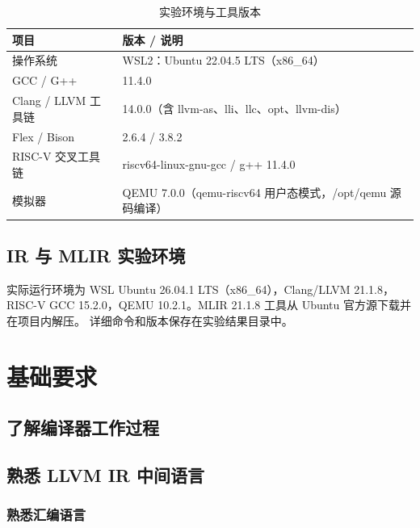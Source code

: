 \documentclass[UTF8,a4paper,10pt]{ctexart}
\begin{document}
\begin{table}[!htbp]
  \centering
  \caption{实验环境与工具版本}
  \label{tab:env}
  \begin{tabular}{ll}
  \toprule
  项目 & 版本 / 说明\\
  \midrule
  操作系统 & WSL2：Ubuntu 22.04.5 LTS（x86\_64）\\
  GCC / G++ & 11.4.0\\
  Clang / LLVM 工具链 & 14.0.0（含 llvm-as、lli、llc、opt、llvm-dis）\\
  Flex / Bison & 2.6.4 / 3.8.2\\
  RISC-V 交叉工具链 & riscv64-linux-gnu-gcc / g++ 11.4.0\\
  模拟器 & QEMU 7.0.0（qemu-riscv64 用户态模式，/opt/qemu 源码编译）\\
  \bottomrule
  \end{tabular}
\end{table}
\subsection{IR 与 MLIR 实验环境}
实际运行环境为 WSL Ubuntu 26.04.1 LTS（x86\_64），Clang/LLVM 21.1.8，
RISC-V GCC 15.2.0，QEMU 10.2.1。MLIR 21.1.8 工具从 Ubuntu 官方源下载并在项目内解压。
详细命令和版本保存在实验结果目录中。

\section{基础要求}
\subsection{了解编译器工作过程}
\begingroup

\endgroup

\subsection{熟悉 LLVM IR 中间语言}
\begingroup
\let\subsection\subsubsection

\endgroup

\subsection{熟悉汇编语言}
\begingroup
\let\subsection\subsubsection

\endgroup
\end{document}
